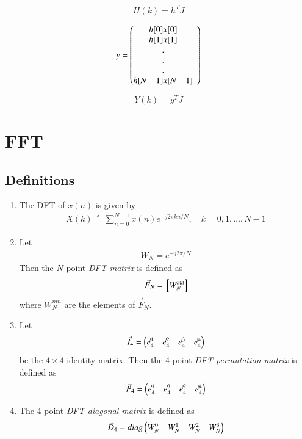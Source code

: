 \documentclass[journal,12pt,twocolumn]{IEEEtran}
\renewcommand\thesection{\arabic{section}}
\begin{document}
\begin{enumerate}[label=\thesection.\arabic*]
	\begin{equation}
		H(k) = h^{T} J
	\end{equation}
	
	\[
	\begin{array}{lc}
		y = 
		\left(\begin{array}{@{}ccc@{}}
			h[0] x[0] \\
			h[1] x[1] \\
			. \\
			. \\
			. \\
			h[N-1] x[N-1] \\
		\end{array}\right) \\[15pt]
	\end{array}
	\]
	
	\begin{equation}
		Y(k) = y^{T} J
	\end{equation} 
	
\end{enumerate}



\section{FFT}
\subsection{Definitions}
\begin{enumerate}[label=\arabic*.,ref=\thesection.\theenumi]
	\item The DFT of $x(n)$ is given by
	\begin{align}
		X(k) \triangleq \sum_{n=0}^{N-1} x(n) e^{-j 2 \pi k n / N}, \quad k=0,1, \ldots, N-1
	\end{align}
	\item Let 
	\begin{align}
		W_{N} = e^{-j2\pi/N} 
	\end{align}
	Then the $N$-point {\em DFT matrix} is defined as 
	\begin{align}
		\vec{F}_{N} = {}\left[W_{N}^{mn}\right]
	\end{align}
	where $W_{N}^{mn}$ are the elements of $\vec{F}_{N}$.
	\item Let 
	\begin{align}
		\vec{I}_4 = \begin{pmatrix}\vec{e}_4^{1} &\vec{e}_4^{2} &\vec{e}_4^{3} &\vec{e}_4^{4} \end{pmatrix}
	\end{align}
	be the $4\times 4$ identity matrix.  Then the 4 point {\em DFT permutation matrix} is defined as 
	\begin{align}
		\vec{P}_4 = \begin{pmatrix}\vec{e}_4^{1} &\vec{e}_4^{3} &\vec{e}_4^{2} &\vec{e}_4^{4} \end{pmatrix}
	\end{align}
	\item The 4 point {\em DFT diagonal matrix} is defined as 
	\begin{align}
		\vec{D}_4 = diag\begin{pmatrix}W_{N}^{0} & W_{N}^{1} & W_{N}^{2} & W_{N}^{3}\end{pmatrix}
	\end{align}
\end{enumerate}
\end{document}
